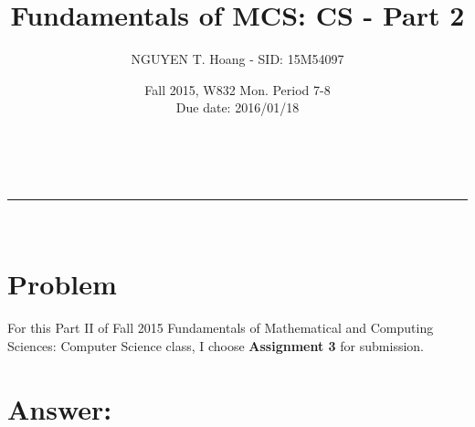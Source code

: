 \documentclass[a4paper,12pt]{report}
\makeatletter
\newcommand{\linia}{\rule{\linewidth}{0.5pt}}
\renewcommand{\maketitle} {
\begin{center}
\vspace{2ex}
{\huge \textsc{\@title}}
\vspace{1ex}
\\
\linia\\
\@author \hfill \@date
\vspace{4ex}
\end{center}
}
\makeatother
\begin{document}

\title{Fundamentals of MCS: CS - Part 2}

\author{NGUYEN T. Hoang - SID: 15M54097}

\date{Fall 2015, W832 Mon. Period 7-8 \\ \hfill Due date: 2016/01/18}

\maketitle

\vspace {2em}

\section*{Problem}
\noindent
For this Part II of Fall 2015 Fundamentals of Mathematical and Computing Sciences: Computer Science class, I choose \textbf{Assignment 3} for submission.



\pagebreak

\section*{Answer:}


\end{document}
